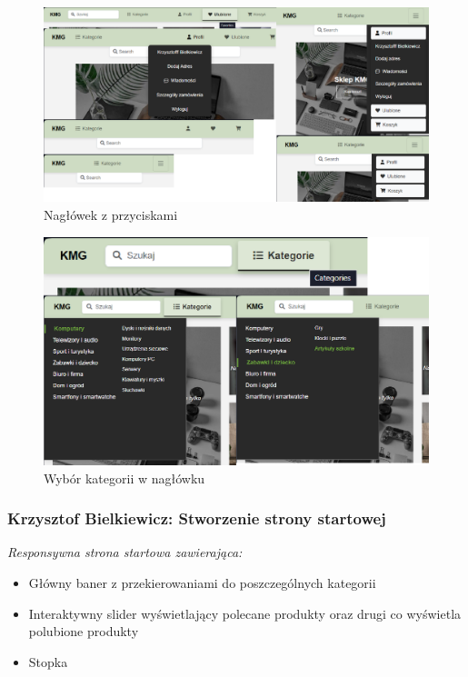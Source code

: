 \documentclass[12pt,a4paper,oneside]{article}
\theoremstyle{definition}
\numberwithin{equation}{section}
\begin{document}
\begin{figure}[H]
    \centering
    \includegraphics[width=0.9\columnwidth]{images/krzysztofBImages/header.png}
    \caption{Nagłówek z przyciskami}
    \label{header}
\end{figure}

\begin{figure}[H]
    \centering
    \includegraphics[width=0.9\columnwidth]{images/krzysztofBImages/header-categories.png}
    \caption{Wybór kategorii w nagłówku}
    \label{header-categories}
\end{figure}


\subsubsection{Krzysztof Bielkiewicz: Stworzenie strony startowej}
\label{1.3.2}
\textit{Responsywna strona startowa zawierająca:}
    \begin{itemize}
        \item Główny baner z przekierowaniami do poszczególnych kategorii
        \item Interaktywny slider wyświetlający polecane produkty oraz drugi co wyświetla polubione produkty
        \item Stopka
    \end{itemize}
\end{document}
